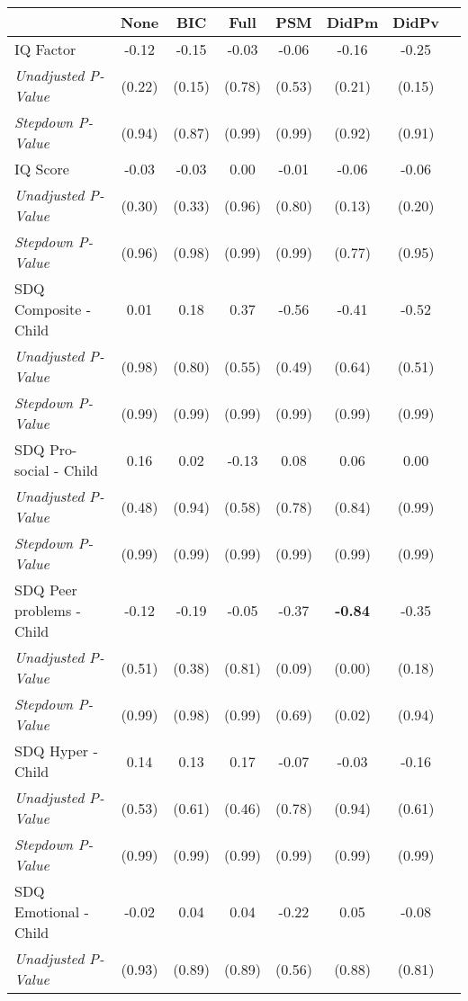 \begin{tabular}{l c c c c c c c}
\toprule
 & None & BIC & Full & PSM & DidPm & DidPv \\
\midrule
IQ Factor & -0.12 & -0.15 & -0.03 & -0.06 & -0.16 & -0.25 \\
\quad \textit{Unadjusted P-Value} & (0.22) & (0.15) & (0.78) & (0.53) & (0.21) & (0.15) \\
\quad \textit{Stepdown P-Value} & (0.94) & (0.87) & (0.99) & (0.99) & (0.92) & (0.91) \\
IQ Score & -0.03 & -0.03 & 0.00 & -0.01 & -0.06 & -0.06 \\
\quad \textit{Unadjusted P-Value} & (0.30) & (0.33) & (0.96) & (0.80) & (0.13) & (0.20) \\
\quad \textit{Stepdown P-Value} & (0.96) & (0.98) & (0.99) & (0.99) & (0.77) & (0.95) \\
SDQ Composite - Child & 0.01 & 0.18 & 0.37 & -0.56 & -0.41 & -0.52 \\
\quad \textit{Unadjusted P-Value} & (0.98) & (0.80) & (0.55) & (0.49) & (0.64) & (0.51) \\
\quad \textit{Stepdown P-Value} & (0.99) & (0.99) & (0.99) & (0.99) & (0.99) & (0.99) \\
SDQ Pro-social - Child & 0.16 & 0.02 & -0.13 & 0.08 & 0.06 & 0.00 \\
\quad \textit{Unadjusted P-Value} & (0.48) & (0.94) & (0.58) & (0.78) & (0.84) & (0.99) \\
\quad \textit{Stepdown P-Value} & (0.99) & (0.99) & (0.99) & (0.99) & (0.99) & (0.99) \\
SDQ Peer problems - Child & -0.12 & -0.19 & -0.05 & -0.37 & \textbf{ -0.84 } & -0.35 \\
\quad \textit{Unadjusted P-Value} & (0.51) & (0.38) & (0.81) & (0.09) & (0.00) & (0.18) \\
\quad \textit{Stepdown P-Value} & (0.99) & (0.98) & (0.99) & (0.69) & (0.02) & (0.94) \\
SDQ Hyper - Child & 0.14 & 0.13 & 0.17 & -0.07 & -0.03 & -0.16 \\
\quad \textit{Unadjusted P-Value} & (0.53) & (0.61) & (0.46) & (0.78) & (0.94) & (0.61) \\
\quad \textit{Stepdown P-Value} & (0.99) & (0.99) & (0.99) & (0.99) & (0.99) & (0.99) \\
SDQ Emotional - Child & -0.02 & 0.04 & 0.04 & -0.22 & 0.05 & -0.08 \\
\quad \textit{Unadjusted P-Value} & (0.93) & (0.89) & (0.89) & (0.56) & (0.88) & (0.81) \\

\end{tabular}
